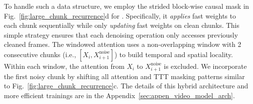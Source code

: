 To handle such a data structure, we employ the strided block-wise causal mask in Fig.~\ref{fig:large_chunk_recurrence}d for  \methodname{}.
Specifically, it \textit{applies} fast weights to each chunk sequentially while only \textit{updating} fast weights on clean chunks.
This simple strategy ensures that each denoising operation only accesses previously cleaned frames. 
The windowed attention uses a non-overlapping window with 2 consecutive chunks (i.e., $[X_i, X_{i+1}^\text{noise}]$) to build temporal and spatial locality.
Within each window, the attention from $X_i$ to  $X_{i+1}^\text{noise}$ is excluded.
We incorporate the first noisy chunk by shifting all attention and TTT masking patterns similar to Fig.~\ref{fig:large_chunk_recurrence}c.
The details of this hybrid architecture and more efficient trainings are in the Appendix~\ref{sec:appen_video_model_arch}.














    

